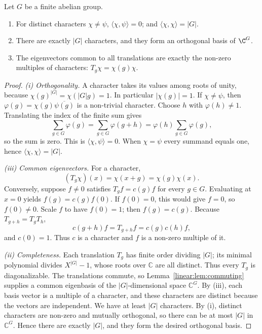 \begin{theorem}\label{linear:thm:characters}
Let $G$ be a finite abelian group.
\begin{enumerate}[label=(\roman*)]
\item For distinct characters $\chi\ne\psi$, $\langle\chi,\psi\rangle=0$; and $\langle\chi,\chi\rangle=|G|$.
\item There are exactly $|G|$ characters, and they form an orthogonal basis of $\C^G$.
\item The eigenvectors common to all translations are exactly the non-zero multiples of characters: $T_g\chi=\chi(g)\chi$.
\end{enumerate}
\end{theorem}
\begin{proof}
\emph{(i) Orthogonality.}
A character takes its values among roots of unity,
because $\chi(g)^{|G|}=\chi(|G|g)=1$.
In particular $|\chi(g)|=1$. If $\chi\ne\psi$,
then $\varphi(g)=\chi(g)\overline{\psi(g)}$
is a non-trivial character. Choose $h$ with
$\varphi(h)\ne1$. Translating the index
of the finite sum gives
\[
\sum_{g\in G}\varphi(g)
=\sum_{g\in G}\varphi(g+h)
=\varphi(h)\sum_{g\in G}\varphi(g),
\]
so the sum is zero. This is
$\langle\chi,\psi\rangle=0$.
When $\chi=\psi$ every summand equals one,
hence $\langle\chi,\chi\rangle=|G|$.

\emph{(iii) Common eigenvectors.}
For a character,
\[
(T_g\chi)(x)=\chi(x+g)=\chi(g)\chi(x).
\]
Conversely, suppose $f\ne0$ satisfies
$T_gf=c(g)f$ for every $g\in G$.
Evaluating at $x=0$ yields
$f(g)=c(g)f(0)$. If $f(0)=0$,
this would give $f=0$, so $f(0)\ne0$.
Scale $f$ to have $f(0)=1$; then $f(g)=c(g)$.
Because $T_{g+h}=T_gT_h$,
\[
c(g+h)f=T_{g+h}f=c(g)c(h)f,
\]
and $c(0)=1$. Thus $c$ is a character
and $f$ is a non-zero multiple of it.

\emph{(ii) Completeness.}
Each translation $T_g$ has finite order
dividing $|G|$; its minimal polynomial
divides $X^{|G|}-1$, whose roots over
$\mathbb C$ are all distinct.
Thus every $T_g$ is diagonalizable.
The translations commute, so
Lemma~\ref{linear:lem:commuting} supplies
a common eigenbasis of the $|G|$-dimensional
space $\mathbb C^G$. By (iii), each basis
vector is a multiple of a character,
and these characters are distinct because
the vectors are independent. We have
at least $|G|$ characters. By (i),
distinct characters are non-zero and
mutually orthogonal, so there can be
at most $|G|$ in $\mathbb C^G$.
Hence there are exactly $|G|$, and they
form the desired orthogonal basis.
\end{proof}

